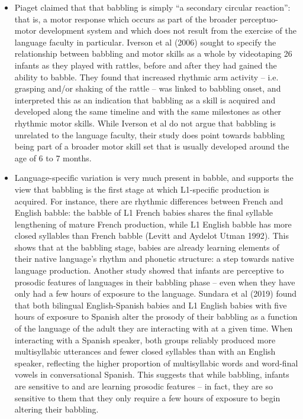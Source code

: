 \documentclass{article}
\begin{document}
\begin{itemize}
    \item Piaget claimed that that babbling is simply “a secondary circular reaction”: that is, a motor response which occurs as part of the broader perceptuo-motor development system and which does not result from the exercise of the language faculty in particular. Iverson et al (2006) sought to specify the relationship between babbling and motor skills as a whole by videotaping 26 infants as they played with rattles, before and after they had gained the ability to babble. They found that increased rhythmic arm activity – i.e. grasping and/or shaking of the rattle – was linked to babbling onset, and interpreted this as an indication that babbling as a skill is acquired and developed along the same timeline and with the same milestones as other rhythmic motor skills. While Iverson et al do not argue that babbling is unrelated to the language faculty, their study does point towards babbling being part of a broader motor skill set that is usually developed around the age of 6 to 7 months.
    \item Language-specific variation is very much present in babble, and supports the view that babbling is the first stage at which L1-specific production is acquired. For instance, there are rhythmic differences between French and English babble: the babble of L1 French babies shares the final syllable lengthening of mature French production, while L1 English babble has more closed syllables than French babble (Levitt and Aydelot Utman 1992). This shows that at the babbling stage, babies are already learning elements of their native language’s rhythm and phonetic structure: a step towards native language production. Another study showed that infants are perceptive to prosodic features of languages in their babbling phase – even when they have only had a few hours of exposure to the language. Sundara et al (2019) found that both bilingual English-Spanish babies and L1 English babies with five hours of exposure to Spanish alter the prosody of their babbling as a function of the language of the adult they are interacting with at a given time. When interacting with a Spanish speaker, both groups reliably produced more multisyllabic utterances and fewer closed syllables than with an English speaker, reflecting the higher proportion of multisyllabic words and word-final vowels in conversational Spanish. This suggests that while babbling, infants are sensitive to and are learning prosodic features – in fact, they are so sensitive to them that they only require a few hours of exposure to begin altering their babbling. 

\end{itemize}
\end{document}

